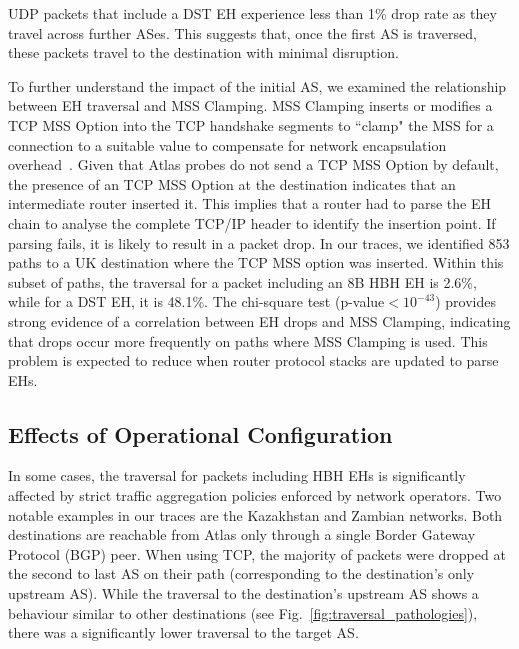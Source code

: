 \documentclass[conference]{IEEEtran}
\begin{document}
UDP packets that include a DST EH experience less than 1\% drop rate as they travel across further ASes.  This
suggests that, once the first AS is traversed, these packets travel to the destination with minimal disruption.



To further understand the impact of the initial AS, we examined the
relationship between EH traversal and MSS Clamping.
MSS Clamping inserts or modifies a TCP MSS Option into the TCP handshake segments
to ``clamp" the MSS for a connection to a suitable value to compensate for
network encapsulation overhead~\cite{custura-mtu}.  
Given that Atlas probes do not send a TCP MSS Option by default, the
presence of an TCP MSS Option at the destination indicates that an intermediate
router inserted it. This implies that a router had to parse the EH chain to analyse
the complete TCP/IP header to identify the insertion point. If parsing
fails, it is likely to result in a packet drop.
In our traces, we identified 853 paths to a UK destination where the TCP
MSS option was inserted. Within
this subset of paths, the traversal for a packet including an 8B HBH EH is 2.6\%, while for a DST EH, it is 48.1\%. The chi-square test (p-value$<10^{-43}$) provides
strong evidence of a correlation between EH drops and MSS Clamping, indicating
that drops occur more frequently on paths where MSS Clamping is used. This problem is expected to reduce when router protocol stacks are updated to parse EHs. 

\subsection{Effects of Operational Configuration}
    \label{subsec: pathologies}

In some cases, the traversal for packets including HBH EHs is significantly
affected by strict traffic aggregation policies enforced by network operators.
Two notable examples in our traces are the Kazakhstan and Zambian networks.
Both destinations are reachable from Atlas only through a single Border Gateway Protocol (BGP) peer. When using TCP, the majority of packets were dropped at the
second to last AS on their path (corresponding to the destination's only upstream AS).
While the traversal to the destination's upstream AS shows a behaviour
similar to other destinations (see Fig.~\ref{fig:traversal_pathologies}),
there was a significantly lower traversal to the target AS.
\end{document}
